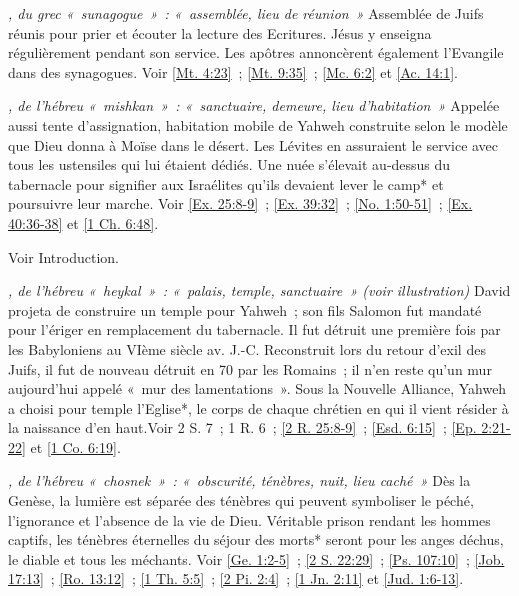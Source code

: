 \begin{multicols}{2}
\textit{, du grec «~sunagogue~»~: «~assemblée, lieu de réunion~»}\newline
Assemblée de Juifs réunis pour prier et écouter la lecture des Ecritures. Jésus y enseigna régulièrement pendant son service. Les apôtres annoncèrent également l'Evangile dans des synagogues. Voir \vref{Mt. 4:23}~; \vref{Mt. 9:35}~; \vref{Mc. 6:2} et \vref{Ac. 14:1}.

\textit{, de l'hébreu «~mishkan~»~: «~sanctuaire, demeure, lieu d'habitation~»}\newline
Appelée aussi tente d'assignation, habitation mobile de Yahweh construite selon le modèle que Dieu donna à Moïse dans le désert. Les Lévites en assuraient le service avec tous les ustensiles qui lui étaient dédiés. Une nuée s'élevait au-dessus du tabernacle pour signifier aux Israélites qu'ils devaient lever le camp* et poursuivre leur marche. Voir \vref{Ex. 25:8-9}~; \vref{Ex. 39:32}~; \vref{No. 1:50-51}~; \vref{Ex. 40:36-38} et \vref{1 Ch. 6:48}.

\textit{}\newline
Voir Introduction.

\textit{, de l'hébreu «~heykal~»~: «~palais, temple, sanctuaire~» (voir illustration)}\newline
David projeta de construire un temple pour Yahweh~; son fils Salomon fut mandaté pour l'ériger en remplacement du tabernacle. Il fut détruit une première fois par les Babyloniens au VIème siècle av. J.-C. Reconstruit lors du retour d'exil des Juifs, il fut de nouveau détruit en 70 par les Romains~; il n'en reste qu'un mur aujourd'hui appelé «~mur des lamentations~». Sous la Nouvelle Alliance, Yahweh a choisi pour temple l'Eglise*, le corps de chaque chrétien en qui il vient résider à la naissance d'en haut.Voir 2 S. 7~; 1 R. 6~; \vref{2 R. 25:8-9}~; \vref{Esd. 6:15}~; \vref{Ep. 2:21-22} et \vref{1 Co. 6:19}.

\textit{, de l'hébreu «~chosnek~»~: «~obscurité, ténèbres, nuit, lieu caché~»}\newline
Dès la Genèse, la lumière est séparée des ténèbres qui peuvent symboliser le péché, l'ignorance et l'absence de la vie de Dieu. Véritable prison rendant les hommes captifs, les ténèbres éternelles du séjour des morts* seront pour les anges déchus, le diable et tous les méchants. Voir \vref{Ge. 1:2-5}~; \vref{2 S. 22:29}~; \vref{Ps. 107:10}~; \vref{Job. 17:13}~; \vref{Ro. 13:12}~; \vref{1 Th. 5:5}~; \vref{2 Pi. 2:4}~; \vref{1 Jn. 2:11} et \vref{Jud. 1:6-13}.


\end{multicols}
